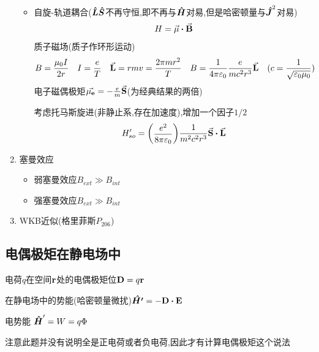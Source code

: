 \begin{formal}
\begin{enumerate}
\begin{itemize}
                        \item 自旋-轨道耦合($\vu*{L}\vu*{S}$不再守恒,即不再与$\vu*{H}$对易,但是哈密顿量与$\vu*{J}^{2}$对易)
                        $$ H = \va{\mu} \vdot \va{B} $$
                        质子磁场(质子作环形运动)
                        $$ 
                        B = \frac{\mu_{0}I}{2r} \quad I = \frac{e}{T} \quad \va{L} = rmv = \frac{2\pi mr^{2}}{T} \quad 
                        B = \frac{1}{4\pi \varepsilon_{0}} \frac{e}{mc^{2}r^{3}}\va{L} \quad (c = \frac{1}{\sqrt{\varepsilon_{0} \mu_{0}}})
                        $$
                        电子磁偶极矩$ \va{\mu_{e}} = -\frac{e}{m} \va{S} $(为经典结果的两倍)

                        考虑托马斯旋进(非静止系,存在加速度),增加一个因子$1/2$
                        $$ H_{so}' = \mqty(\dfrac{e^{2}}{8\pi \varepsilon_{0}}) \frac{1}{m^{2}c^{2}r^{3}} \va{S} \vdot \va{L} $$
                        
                    \end{itemize}  

                \item 塞曼效应
                    \begin{itemize}
                        \item 弱塞曼效应$ B_{ext}  \gg B_{int}$
                        \item 强塞曼效应$ B_{ext}  \gg B_{int}$
                    \end{itemize}
                
                \item WKB近似(格里菲斯$P_{206}$) 

            \end{enumerate}
        \end{formal}

        \subsection{电偶极矩在静电场中}
            \begin{formal}
                电荷$q$在空间$\vb{r}$处的电偶极矩位$\vb{D} = q \vb{r}$

                在静电场中的势能(哈密顿量微扰)$ \vu*{H'} = - \vb{D} \vdot \vb{E} $

                电势能 $ \vu*{H}' = W = q \Phi  $
            \end{formal}

            注意此题并没有说明全是正电荷或者负电荷,因此才有计算电偶极矩这个说法


